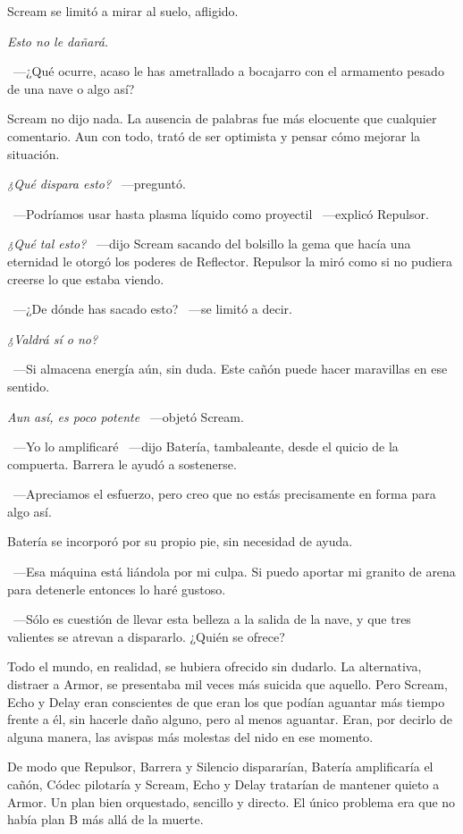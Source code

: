 Scream se limitó a mirar al suelo, afligido.

\emph{Esto no le dañará.}

~---¿Qué ocurre, acaso le has ametrallado a bocajarro con el armamento pesado de una nave o algo así?

Scream no dijo nada. La ausencia de palabras fue más elocuente que cualquier comentario. Aun con todo, trató de ser optimista y pensar cómo mejorar la situación.

\emph{¿Qué dispara esto?} ~---preguntó.

~---Podríamos usar hasta plasma líquido como proyectil ~---explicó Repulsor.

\emph{¿Qué tal esto?} ~---dijo Scream sacando del bolsillo la gema que hacía una eternidad le otorgó los poderes de Reflector. Repulsor la miró como si no pudiera creerse lo que estaba viendo.

~---¿De dónde has sacado esto? ~---se limitó a decir.

\emph{¿Valdrá sí o no?}

~---Si almacena energía aún, sin duda. Este cañón puede hacer maravillas en ese sentido.

\emph{Aun así, es poco potente} ~---objetó Scream.

~---Yo lo amplificaré ~---dijo Batería, tambaleante, desde el quicio de la compuerta. Barrera le ayudó a sostenerse.

~---Apreciamos el esfuerzo, pero creo que no estás precisamente en forma para algo así.

Batería se incorporó por su propio pie, sin necesidad de ayuda.

~---Esa máquina está liándola por mi culpa. Si puedo aportar mi granito de arena para detenerle entonces lo haré gustoso.

~---Sólo es cuestión de llevar esta belleza a la salida de la nave, y que tres valientes se atrevan a dispararlo. ¿Quién se ofrece?

Todo el mundo, en realidad, se hubiera ofrecido sin dudarlo. La alternativa, distraer a Armor, se presentaba mil veces más suicida que aquello. Pero Scream, Echo y Delay eran conscientes de que eran los que podían aguantar más tiempo frente a él, sin hacerle daño alguno, pero al menos aguantar. Eran, por decirlo de alguna manera, las avispas más molestas del nido en ese momento.

De modo que Repulsor, Barrera y Silencio dispararían, Batería amplificaría el cañón, Códec pilotaría y Scream, Echo y Delay tratarían de mantener quieto a Armor. Un plan bien orquestado, sencillo y directo. El único problema era que no había plan B más allá de la muerte.

